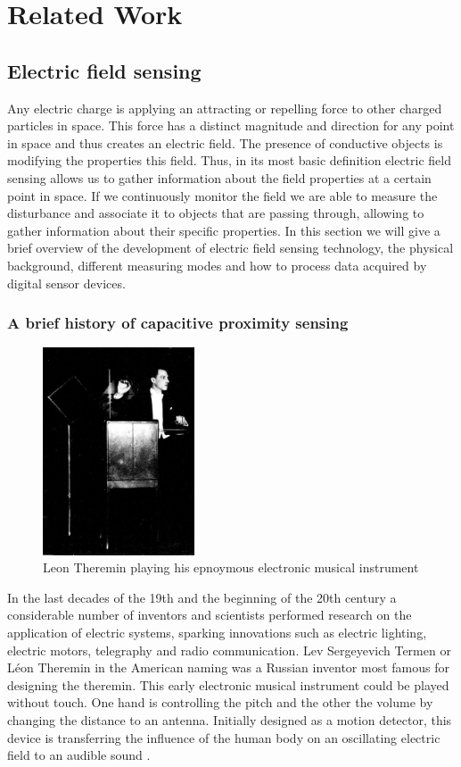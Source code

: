 \chapter{Related Work}
\section{Electric field sensing}
Any electric charge is applying an attracting or repelling force to other charged particles in space. This force has a distinct magnitude and direction for any point in space and thus creates an electric field. The presence of conductive objects is modifying the properties this field. Thus, in its most basic definition electric field sensing allows us to gather information about the field properties at a certain point in space. If we continuously monitor the field we are able to measure the disturbance and associate it to objects that are passing through, allowing to gather information about their specific properties. In this section we will give a brief overview of the development of electric field sensing technology, the physical background, different measuring modes and how to process data acquired by digital sensor devices.
\subsection{A brief history of capacitive proximity sensing}
\begin{figure}[h]
\centering
\includegraphics[width=0.4\textwidth]{images/leon_theremin.jpg}
\caption{Leon Theremin playing his epnoymous electronic musical instrument \cite{Glinsky2000}}
\label{fig:leon_theremin}
\end{figure}
In the last decades of the 19th and the beginning of the 20th century a considerable number of inventors and scientists performed research on the application of electric systems, sparking innovations such as electric lighting, electric motors, telegraphy and radio communication. Lev Sergeyevich Termen or Léon Theremin in the American naming was a Russian inventor most famous for designing the theremin. This early electronic musical instrument could be played without touch. One hand is controlling the pitch and the other the volume by changing the distance to an antenna. Initially designed as a motion detector, this device is transferring the influence of the human body on an oscillating electric field to an audible sound \cite{Glinsky2000}. 


